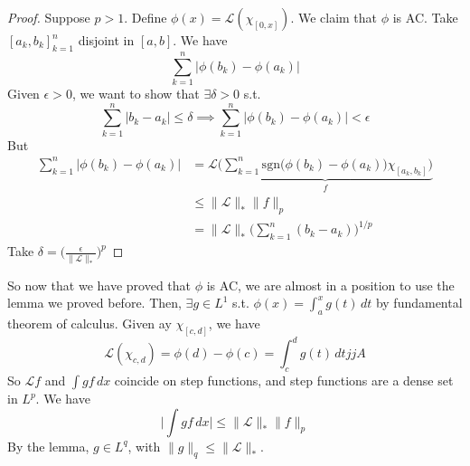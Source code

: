   \begin{proof}
    Suppose $p > 1$. Define $\phi(x) = (\chi_{[0, x]})$. We claim that $\phi$ is AC. Take $[a_k, b_k]_{k=1}^n$ disjoint in $[a, b]$. We have 
    \begin{equation}
      \sum_{k=1}^n |\phi(b_k) - \phi(a_k)|
    \end{equation}
    Given $\epsilon > 0$, we want to show that $\exists \delta >0$ s.t. 
    \begin{equation}
      \sum_{k=1}^n |b_k - a_k| \leq \delta \implies \sum_{k=1}^n |\phi(b_k) - \phi(a_k)| < \epsilon 
    \end{equation}
    But 
    \begin{align}
      \sum_{k=1}^n |\phi(b_k) - \phi(a_k)| & = \mathcal{L} \underbrace{\bigg( \sum_{k=1}^n \mathrm{sgn} \big( \phi(b_k) - \phi(a_k) \big) \chi_{[a_k, b_k]} \bigg)}_{f} \\ 
      & \leq \|\mathcal{L}\|_\ast \|f\|_p \\ 
      & = \|\mathcal{L}\|_\ast \bigg( \sum_{k=1}^n (b_k - a_k) \bigg)^{1/p}
    \end{align}
    Take $\delta = \big(  \big)^{p}$
  \end{proof}

  So now that we have proved that $\phi$ is AC, we are almost in a position to use the lemma we proved before. Then, $\exists g \in L^1$ s.t. $\phi(x) = \int_a^x g(t) \,dt$ by fundamental theorem of calculus. Given ay $\chi_{[c, d]}$, we have 
  \begin{equation}
    \mathcal{L}(\chi_{c, d}) = \phi(d) - \phi(c) = \int_c^d g(t) \,dtjjA
  \end{equation}
  So $ f$ and $\int g f \,dx$ coincide on step functions, and step functions are a dense set in $L^p$. We have 
  \begin{equation}
    \bigg| \int g f \,dx \bigg| \leq \|\mathcal{L}\|_\ast \|f\|_p 
  \end{equation}
  By the lemma, $g \in L^q$, with $\|g\|_q \leq \|\|_\ast$. 

